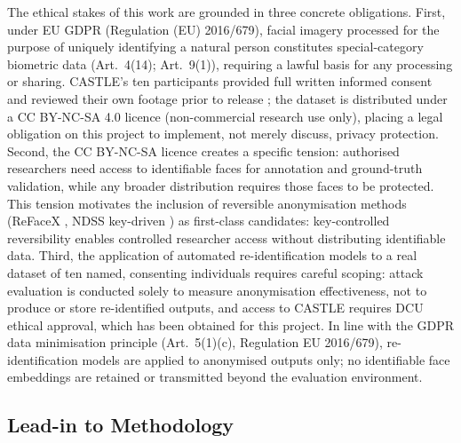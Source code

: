 \documentclass[12pt, onecolumn]{IEEEtran}
\begin{document}
The ethical stakes of this work are grounded in three concrete
obligations. First, under EU GDPR (Regulation (EU) 2016/679), facial
imagery processed for the purpose of uniquely identifying a natural
person constitutes special-category biometric data (Art.~4(14);
Art.~9(1)), requiring a lawful basis for any processing or sharing.
CASTLE's ten participants provided full written informed consent and
reviewed their own footage prior to release \cite{rossetto2025castle};
the dataset is distributed under a CC BY-NC-SA 4.0 licence
(non-commercial research use only), placing a legal obligation on this
project to implement, not merely discuss, privacy protection. Second,
the CC BY-NC-SA licence creates a specific tension: authorised
researchers need access to identifiable faces for annotation and
ground-truth validation, while any broader distribution requires those
faces to be protected. This tension motivates the inclusion of
reversible anonymisation methods (ReFaceX
\cite{muhammad2026refacex}, NDSS key-driven \cite{zhang2025keydriven})
as first-class candidates: key-controlled reversibility enables
controlled researcher access without distributing identifiable data.
Third, the application of automated re-identification models to a
real dataset of ten named, consenting individuals requires careful
scoping: attack evaluation is conducted solely to measure
anonymisation effectiveness, not to produce or store re-identified
outputs, and access to CASTLE requires DCU ethical approval, which
has been obtained for this project. In line with the GDPR data
minimisation principle (Art.~5(1)(c), Regulation EU 2016/679),
re-identification models are applied to anonymised outputs only;
no identifiable face embeddings are retained or transmitted beyond
the evaluation environment.

\subsection{Lead-in to Methodology}
\end{document}
